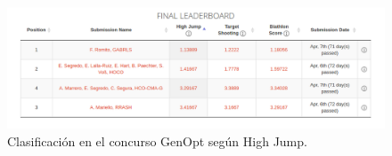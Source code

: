 \begin{figure}[!ht]
  \centering
	\includegraphics[scale=0.5]{images/final}
  \caption{Clasificación en el concurso GenOpt según High Jump.}
\end{figure}

\newpage